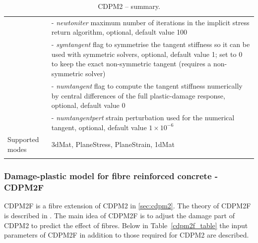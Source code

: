 \documentclass[a4paper]{article}
\newcommand{\param}[1]{{\it #1}}
\begin{document}
\begin{longtable}{|l|p{9cm}|}
&- \param{newtoniter} maximum number of iterations in the implicit stress return algorithm, optional, default value 100\\
&- \param{symtangent} flag to symmetrise the tangent stiffness so it can be used with symmetric solvers, optional, default value 1; set to 0 to keep the exact non-symmetric tangent (requires a non-symmetric solver)\\
&- \param{numtangent} flag to compute the tangent stiffness numerically by central differences of the full plastic-damage response, optional, default value 0\\
&- \param{numtangentpert} strain perturbation used for the numerical tangent, optional, default value $1 \times 10^{-6}$\\
Supported modes& 3dMat, PlaneStress, PlaneStrain, 1dMat\\
\hline
\caption{CDPM2 -- summary.}
\label{cdpm2_table}
\end{longtable}


\subsubsection{Damage-plastic model for fibre reinforced concrete - CDPM2F}
CDPM2F is a fibre extension of CDPM2 in \ref{sec:cdpm2}. The theory of CDPM2F is described in \cite{ZhoMarGra24}.
The main idea of CDPM2F is to adjust the damage part of CDPM2 to predict the effect of fibres.
Below in Table~\ref{cdpm2f_table} the input parameters of CDPM2F in addition to those required for CDPM2 are described. 
\end{document}
